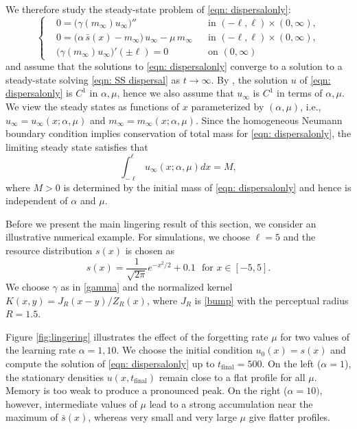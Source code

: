 \documentclass{article}
\begin{document}
We therefore study the steady-state problem of \eqref{eqn: dispersalonly}:
\begin{equation}\label{eqn: SS dispersal}
\left\{
\begin{aligned}
&0  = \big(\gamma(m_\infty) u_\infty\big)''
&& \text{in } (-\ell,\ell)\times(0,\infty), \\[4pt]
&0 = \big(\alpha\,\bar s(x)-m_\infty\big)\,u_\infty - \mu\,m_\infty
&& \text{in } (-\ell,\ell)\times(0,\infty),\\
&\big(\gamma(m_\infty) u_\infty\big)'(\pm\ell) = 0
&& \text{on } (0,\infty)
\end{aligned}
\right.
\end{equation}
and assume that the solutions to \eqref{eqn: dispersalonly} converge to a solution to a steady-state solving \eqref{eqn: SS dispersal} as $t\to \infty$. By \cite[Theorem 7.3]{amann1990}, the solution $u$ of \eqref{eqn: dispersalonly} is $C^1$ in $\alpha,\mu$, hence we also assume that $u_\infty$ is $C^1$ in terms of $\alpha,\mu$. We view the steady states as functions of $x$ parameterized by $(\alpha,\mu)$, i.e.,
$u_\infty=u_\infty(x;\alpha,\mu)$ and $m_\infty=m_\infty(x;\alpha,\mu)$. Since the homogeneous Neumann boundary condition implies conservation of total mass for \eqref{eqn: dispersalonly}, the limiting steady state satisfies that \begin{equation}
    \label{mass conservation}
    \int_{-\ell}^\ell u_\infty(x;\alpha,\mu) dx = M,
\end{equation} where $M>0$ is determined by the initial mass of \eqref{eqn: dispersalonly} and hence is independent of $\alpha$ and $\mu$.

Before we present the main lingering result of this section, we consider an illustrative numerical example. 
For simulations, we choose $\ell=5$ and the resource distribution $s(x)$ is chosen as
\begin{equation*}
    s(x) = \frac{1}{\sqrt{2\pi}}e^{-x^2/2}+0.1 \,\,\text{ for }x\in[-5,5].
\end{equation*} We choose $\gamma$ as in \eqref{gamma} and the normalized kernel $K(x,y)=J_R(x-y)/Z_R(x)$, where $J_R$ is  \eqref{bump} with the perceptual radius $R=1.5$.


Figure \ref{fig:lingering} illustrates the effect of the forgetting rate $\mu$ for two values of the learning rate $\alpha=1,10$.  
 We choose the initial condition 
$u_0(x)=s(x)$ and compute the solution of \eqref{eqn: dispersalonly}
up to $t_{\text{final}}=500$. On the left ($\alpha=1$), the stationary densities $u(x,t_{\text{final}})$ remain close to a flat profile for all $\mu$. Memory is too weak to produce a pronounced peak. On the right ($\alpha=10)$, however, intermediate values of $\mu$ lead to a strong accumulation near the maximum of $\bar s(x)$, whereas very small and very large 
$\mu$ give flatter profiles. 
\end{document}
